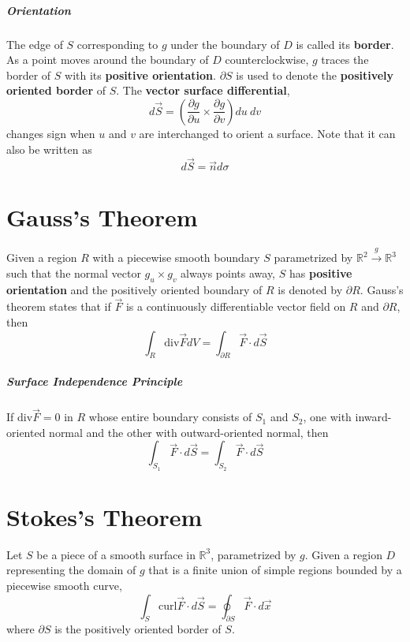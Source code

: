 \documentclass[11pt]{article}
\begin{document}
	\subparagraph{Orientation} The edge of $S$ corresponding to $g$ under the boundary of $D$ is called its \textbf{border}. As a point moves around the boundary of $D$ counterclockwise, $g$ traces the border of $S$ with its \textbf{positive orientation}. $\partial S$ is used to denote the \textbf{positively oriented border} of $S$. The \textbf{vector surface differential},
		\begin{equation}
			d\vec{S} = \left( \frac{\partial g}{\partial u} \times \frac{\partial g}{\partial v} \right) du\ dv
		\end{equation}
		changes sign when $u$ and $v$ are interchanged to orient a surface. Note that it can also be written as
		\begin{equation}
			d\vec{S} = \vec{n} d\sigma
		\end{equation}
		
\section{Gauss's Theorem}
	Given a region $R$ with a piecewise smooth boundary $S$ parametrized by $\mathbb{R}^2 \xrightarrow{g} \mathbb{R}^3$ such that the normal vector $g_u \times g_v$ always points away, $S$ has \textbf{positive orientation} and the positively oriented boundary of $R$ is denoted by $\partial R$. Gauss's theorem states that if $\vec{F}$ is a continuously differentiable vector field on $R$ and $\partial R$, then
	\begin{equation}
		\int_R \text{div} \vec{F} dV = \int_{\partial R} \vec{F} \cdot d\vec{S}
	\end{equation}
	
	\subparagraph{Surface Independence Principle} If div$\vec{F} = 0$ in $R$ whose entire boundary consists of $S_1$ and $S_2$, one with inward-oriented normal and the other with outward-oriented normal, then
		\begin{equation}
			\int_{S_1} \vec{F} \cdot d\vec{S} = \int_{S_2} \vec{F} \cdot d\vec{S}
		\end{equation}
		
\section{Stokes's Theorem}
	Let $S$ be a piece of a smooth surface in $\mathbb{R}^3$, parametrized by $g$. Given a region $D$ representing the domain of $g$ that is a finite union of simple regions bounded by a piecewise smooth curve,
	\begin{equation}
		\int_S \text{curl}\vec{F} \cdot d\vec{S} = \oint_{\partial S} \vec{F} \cdot d\vec{x}
	\end{equation}
	where $\partial S$ is the positively oriented border of $S$.
	
\end{document}
